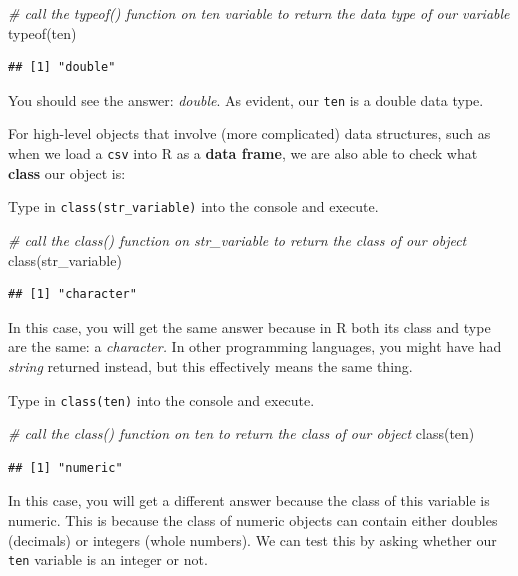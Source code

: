 \documentclass[
]{book}
\newenvironment{Shaded}{\begin{snugshade}}{\end{snugshade}}
\newcommand{\CommentTok}[1]{\textcolor[rgb]{0.56,0.35,0.01}{\textit{#1}}}
\newcommand{\FunctionTok}[1]{\textcolor[rgb]{0.00,0.00,0.00}{#1}}
\newcommand{\NormalTok}[1]{#1}
\begin{document}
\begin{Shaded}
\begin{Highlighting}[]
\CommentTok{\# call the typeof() function on ten variable to return the data type of our variable}
\FunctionTok{typeof}\NormalTok{(ten)}
\end{Highlighting}
\end{Shaded}

\begin{verbatim}
## [1] "double"
\end{verbatim}

You should see the answer: \emph{double}. As evident, our \texttt{ten} is a double data type.

For high-level objects that involve (more complicated) data structures, such as when we load a \texttt{csv} into R as a \textbf{data frame}, we are also able to check what \textbf{class} our object is:

Type in \texttt{class(str\_variable)} into the console and execute.

\begin{Shaded}
\begin{Highlighting}[]
\CommentTok{\# call the class() function on str\_variable to return the class of our object}
\FunctionTok{class}\NormalTok{(str\_variable)}
\end{Highlighting}
\end{Shaded}

\begin{verbatim}
## [1] "character"
\end{verbatim}

In this case, you will get the same answer because in R both its class and type are the same: a \emph{character.} In other programming languages, you might have had \emph{string} returned instead, but this effectively means the same thing.

Type in \texttt{class(ten)} into the console and execute.

\begin{Shaded}
\begin{Highlighting}[]
\CommentTok{\# call the class() function on ten to return the class of our object}
\FunctionTok{class}\NormalTok{(ten)}
\end{Highlighting}
\end{Shaded}

\begin{verbatim}
## [1] "numeric"
\end{verbatim}

In this case, you will get a different answer because the class of this variable is numeric. This is because the class of numeric objects can contain either doubles (decimals) or integers (whole numbers). We can test this by asking whether our \texttt{ten} variable is an integer or not.
\end{document}

